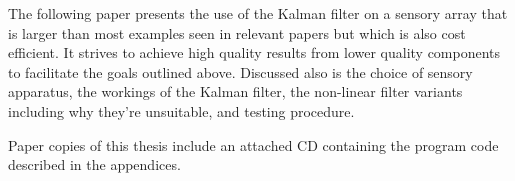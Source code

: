 	The following paper presents the use of the Kalman filter on a sensory array that is larger than most examples seen in relevant papers but which is also cost efficient. It strives to achieve high quality results from lower quality components to facilitate the goals outlined above. Discussed also is the choice of sensory apparatus, the workings of the Kalman filter, the non-linear filter variants including why they're unsuitable, and testing procedure. \par
    Paper copies of this thesis include an attached CD containing the program code described in the appendices. 













